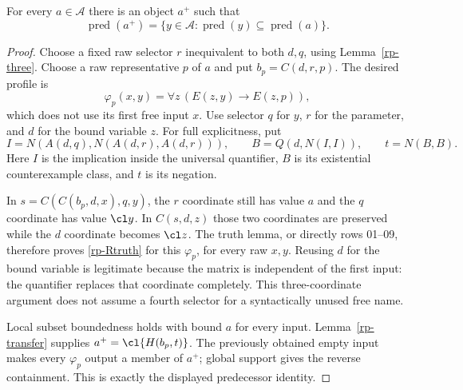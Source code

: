 \begin{lemma}\label{rp-power}
For every $a\in\mathcal A$ there is an object $a^+$ such that
\[
 \operatorname{pred}(a^+)
   =\{y\in\mathcal A:\operatorname{pred}(y)
                         \subseteq\operatorname{pred}(a)\}.
\]
\end{lemma}
\begin{proof}
Choose a fixed raw selector $r$ inequivalent to both $d,q$, using
Lemma~\ref{rp-three}. Choose a raw representative $p$ of $a$ and put
$b_p=C(d,r,p)$. The desired profile is
\[
 \varphi_p(x,y)=\forall z\,(E(z,y)\longrightarrow E(z,p)),
\]
which does not use its first free input $x$. Use selector $q$ for $y$,
$r$ for the parameter, and $d$ for the bound variable $z$.
For full explicitness, put
\[
 I=N(A(d,q),N(A(d,r),A(d,r))),\qquad
 B=Q(d,N(I,I)),\qquad t=N(B,B).
\]
Here $I$ is the implication inside the universal quantifier, $B$ is
its existential counterexample class, and $t$ is its negation.

In $s=C(C(b_p,d,x),q,y)$, the $r$ coordinate still has value $a$
and the $q$ coordinate has value $\cl y$. In $C(s,d,z)$ those two
coordinates are preserved while the $d$ coordinate becomes $\cl z$.
The truth lemma, or directly rows 01--09, therefore proves
\eqref{rp-Rtruth} for this $\varphi_p$, for every raw $x,y$.
Reusing $d$ for the bound variable is legitimate because the matrix
is independent of the first input: the quantifier replaces that
coordinate completely. This three-coordinate argument does not assume
a fourth selector for a syntactically unused free name.

Local subset boundedness holds with bound $a$ for every input.
Lemma~\ref{rp-transfer} supplies $a^+=\cl{H(b_p,t)}$. The previously
obtained empty input makes every $\varphi_p$ output a member of
$a^+$; global support gives the reverse containment. This is exactly
the displayed predecessor identity.
\end{proof}

